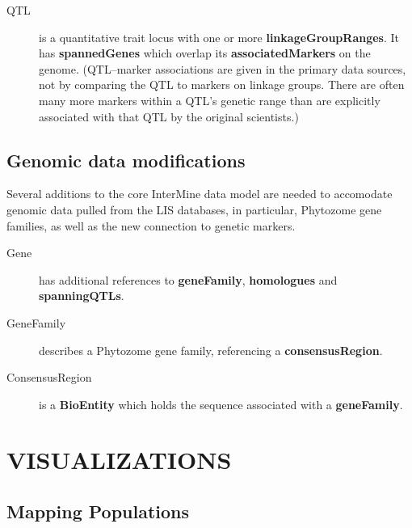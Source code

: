 \documentclass[]{pagposter}
\begin{document}
\begin{multicols*}{3}
\begin{description}
    \item[QTL] is a quantitative trait locus with one or more \textbf{linkageGroupRanges}. It has \textbf{spannedGenes} which overlap its \textbf{associatedMarkers} on the genome.
      (QTL--marker associations are given in the primary data sources, not by comparing the QTL to markers on linkage groups. There are often many more markers within a QTL's genetic range than are explicitly
      associated with that QTL by the original scientists.)

  \end{description}

  \subsection*{Genomic data modifications}

  Several additions to the core InterMine data model are needed to accomodate genomic data pulled from the LIS databases, in particular, Phytozome gene families, as well as the new connection to genetic markers.

  \begin{description}

    \item[Gene] has additional references to \textbf{geneFamily}, \textbf{homologues} and \textbf{spanningQTLs}.

    \item[GeneFamily] describes a Phytozome gene family, referencing a \textbf{consensusRegion}.

    \item[ConsensusRegion] is a \textbf{BioEntity} which holds the sequence associated with a \textbf{geneFamily}.

  \end{description}


  \section*{VISUALIZATIONS}

  \subsection*{Mapping Populations}


\end{multicols*}
\end{document}
